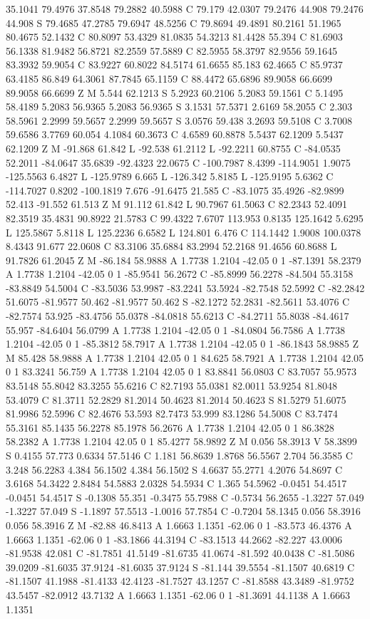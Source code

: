 {{{35.1041 79.4976 37.8548 79.2882 40.5988 C 79.179 42.0307 79.2476 44.908 79.2476 44.908 S 79.4685 47.2785 79.6947 48.5256 C 79.8694 49.4891 80.2161 51.1965 80.4675 52.1432 C 80.8097 53.4329 81.0835 54.3213 81.4428 55.394 C 81.6903 56.1338 81.9482 56.8721 82.2559 57.5889 C 82.5955 58.3797 82.9556 59.1645 83.3932 59.9054 C 83.9227 60.8022 84.5174 61.6655 85.183 62.4665 C 85.9737 63.4185 86.849 64.3061 87.7845 65.1159 C 88.4472 65.6896 89.9058 66.6699 89.9058 66.6699 Z M 5.544 62.1213 S 5.2923 60.2106 5.2083 59.1561 C 5.1495 58.4189 5.2083 56.9365 5.2083 56.9365 S 3.1531 57.5371 2.6169 58.2055 C 2.303 58.5961 2.2999 59.5657 2.2999 59.5657 S 3.0576 59.438 3.2693 59.5108 C 3.7008 59.6586 3.7769 60.054 4.1084 60.3673 C 4.6589 60.8878 5.5437 62.1209 5.5437 62.1209 Z M -91.868 61.842 L -92.538 61.2112 L -92.2211 60.8755 C -84.0535 52.2011 -84.0647 35.6839 -92.4323 22.0675 C -100.7987 8.4399 -114.9051 1.9075 -125.5563 6.4827 L -125.9789 6.665 L -126.342 5.8185 L -125.9195 5.6362 C -114.7027 0.8202 -100.1819 7.676 -91.6475 21.585 C -83.1075 35.4926 -82.9899 52.413 -91.552 61.513 Z M 91.112 61.842 L 90.7967 61.5063 C 82.2343 52.4091 82.3519 35.4831 90.8922 21.5783 C 99.4322 7.6707 113.953 0.8135 125.1642 5.6295 L 125.5867 5.8118 L 125.2236 6.6582 L 124.801 6.476 C 114.1442 1.9008 100.0378 8.4343 91.677 22.0608 C 83.3106 35.6884 83.2994 52.2168 91.4656 60.8688 L 91.7826 61.2045 Z M -86.184 58.9888 A 1.7738 1.2104 -42.05 0 1 -87.1391 58.2379 A 1.7738 1.2104 -42.05 0 1 -85.9541 56.2672 C -85.8999 56.2278 -84.504 55.3158 -83.8849 54.5004 C -83.5036 53.9987 -83.2241 53.5924 -82.7548 52.5992 C -82.2842 51.6075 -81.9577 50.462 -81.9577 50.462 S -82.1272 52.2831 -82.5611 53.4076 C -82.7574 53.925 -83.4756 55.0378 -84.0818 55.6213 C -84.2711 55.8038 -84.4617 55.957 -84.6404 56.0799 A 1.7738 1.2104 -42.05 0 1 -84.0804 56.7586 A 1.7738 1.2104 -42.05 0 1 -85.3812 58.7917 A 1.7738 1.2104 -42.05 0 1 -86.1843 58.9885 Z M 85.428 58.9888 A 1.7738 1.2104 42.05 0 1 84.625 58.7921 A 1.7738 1.2104 42.05 0 1 83.3241 56.759 A 1.7738 1.2104 42.05 0 1 83.8841 56.0803 C 83.7057 55.9573 83.5148 55.8042 83.3255 55.6216 C 82.7193 55.0381 82.0011 53.9254 81.8048 53.4079 C 81.3711 52.2829 81.2014 50.4623 81.2014 50.4623 S 81.5279 51.6075 81.9986 52.5996 C 82.4676 53.593 82.7473 53.999 83.1286 54.5008 C 83.7474 55.3161 85.1435 56.2278 85.1978 56.2676 A 1.7738 1.2104 42.05 0 1 86.3828 58.2382 A 1.7738 1.2104 42.05 0 1 85.4277 58.9892 Z M 0.056 58.3913 V 58.3899 S 0.4155 57.773 0.6334 57.5146 C 1.181 56.8639 1.8768 56.5567 2.704 56.3585 C 3.248 56.2283 4.384 56.1502 4.384 56.1502 S 4.6637 55.2771 4.2076 54.8697 C 3.6168 54.3422 2.8484 54.5883 2.0328 54.5934 C 1.365 54.5962 -0.0451 54.4517 -0.0451 54.4517 S -0.1308 55.351 -0.3475 55.7988 C -0.5734 56.2655 -1.3227 57.049 -1.3227 57.049 S -1.1897 57.5513 -1.0016 57.7854 C -0.7204 58.1345 0.056 58.3916 0.056 58.3916 Z M -82.88 46.8413 A 1.6663 1.1351 -62.06 0 1 -83.573 46.4376 A 1.6663 1.1351 -62.06 0 1 -83.1866 44.3194 C -83.1513 44.2662 -82.227 43.0006 -81.9538 42.081 C -81.7851 41.5149 -81.6735 41.0674 -81.592 40.0438 C -81.5086 39.0209 -81.6035 37.9124 -81.6035 37.9124 S -81.144 39.5554 -81.1507 40.6819 C -81.1507 41.1988 -81.4133 42.4123 -81.7527 43.1257 C -81.8588 43.3489 -81.9752 43.5457 -82.0912 43.7132 A 1.6663 1.1351 -62.06 0 1 -81.3691 44.1138 A 1.6663 1.1351 }}}
